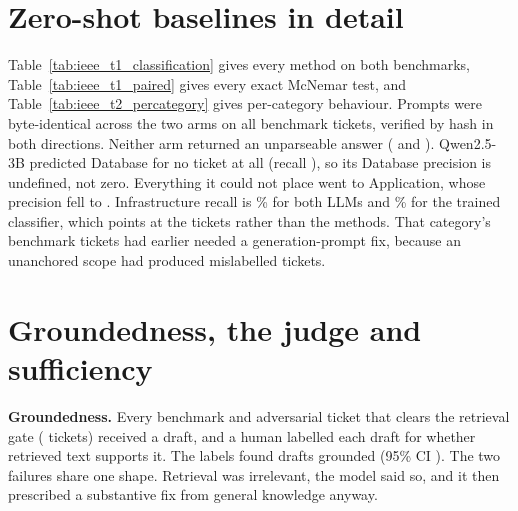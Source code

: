 \documentclass[conference,onecolumn,a4paper]{IEEEtran}
\begin{document}



\section{Zero-shot baselines in detail}
Table~\ref{tab:ieee_t1_classification} gives every method on both benchmarks, Table~\ref{tab:ieee_t1_paired} gives every exact McNemar test, and Table~\ref{tab:ieee_t2_percategory} gives per-category behaviour. Prompts were byte-identical across the two arms on all  benchmark tickets, verified by hash in both directions. Neither arm returned an unparseable answer ( and ). Qwen2.5-3B predicted Database for no ticket at all (recall ), so its Database precision is undefined, not zero. Everything it could not place went to Application, whose precision fell to . Infrastructure recall is \% for both LLMs and \% for the trained classifier, which points at the tickets rather than the methods. That category's benchmark tickets had earlier needed a generation-prompt fix, because an unanchored scope had produced mislabelled tickets.





\section{Groundedness, the judge and sufficiency}
\textbf{Groundedness.} Every benchmark and adversarial ticket that clears the retrieval gate ( tickets) received a draft, and a human labelled each draft for whether retrieved text supports it. The labels found  drafts grounded (95\% CI ). The two failures share one shape. Retrieval was irrelevant, the model said so, and it then prescribed a substantive fix from general knowledge anyway.
\end{document}
